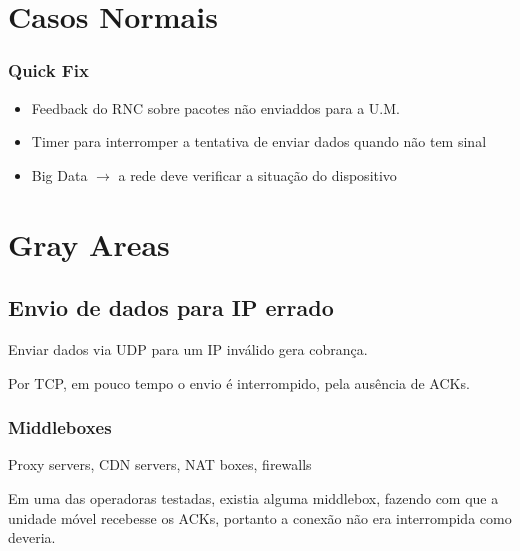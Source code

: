 \documentclass[brazil]{beamer}
\begin{document}
\section{Casos Normais}



\begin{frame}[fragile]
        \frametitle{Quick Fix}
        \begin{itemize}
            \item Feedback do RNC sobre pacotes não enviaddos para a U.M.
            \item Timer para interromper a tentativa de enviar dados quando não tem sinal
            \item Big Data $\rightarrow$ a rede deve verificar a situação do dispositivo
        \end{itemize}
\end{frame}

\section{Gray Areas}

\subsection{Envio de dados para IP errado}

\begin{frame}[fragile]
    Enviar dados via UDP para um IP inválido gera cobrança.

    \vspace{0.4cm}
    Por TCP, em pouco tempo o envio é interrompido, pela ausência de ACKs.
\end{frame}

\begin{frame}[fragile]
    \frametitle{Middleboxes}
    Proxy servers, CDN servers, NAT boxes, firewalls

    \vspace{0.4cm}
    \pause
    Em uma das operadoras testadas, existia alguma middlebox, fazendo com que a unidade móvel recebesse os ACKs, portanto a conexão não era interrompida como deveria.
\end{frame}
\end{document}
